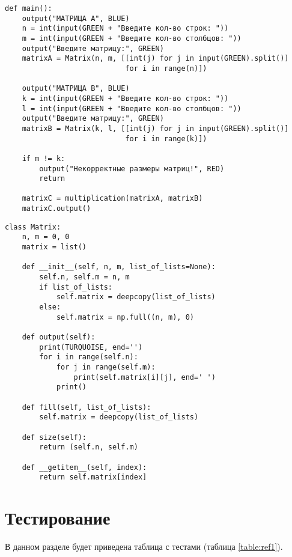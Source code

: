 \begin{lstlisting}[label=some-code,caption=Главная функция main]
def main():
    output("МАТРИЦА A", BLUE)
    n = int(input(GREEN + "Введите кол-во строк: "))
    m = int(input(GREEN + "Введите кол-во столбцов: "))
    output("Введите матрицу:", GREEN)
    matrixA = Matrix(n, m, [[int(j) for j in input(GREEN).split()]
                            for i in range(n)])

    output("МАТРИЦА B", BLUE)
    k = int(input(GREEN + "Введите кол-во строк: "))
    l = int(input(GREEN + "Введите кол-во столбцов: "))
    output("Введите матрицу:", GREEN)
    matrixB = Matrix(k, l, [[int(j) for j in input(GREEN).split()]
                            for i in range(k)])

    if m != k:
        output("Некорректные размеры матриц!", RED)
        return

    matrixC = multiplication(matrixA, matrixB)
    matrixC.output()
\end{lstlisting}

\begin{lstlisting}[label=some-code,caption=Класс matrix]
class Matrix:
    n, m = 0, 0
    matrix = list()

    def __init__(self, n, m, list_of_lists=None):
        self.n, self.m = n, m
        if list_of_lists:
            self.matrix = deepcopy(list_of_lists)
        else:
            self.matrix = np.full((n, m), 0)

    def output(self):
        print(TURQUOISE, end='')
        for i in range(self.n):
            for j in range(self.m):
                print(self.matrix[i][j], end=' ')
            print()

    def fill(self, list_of_lists):
        self.matrix = deepcopy(list_of_lists)

    def size(self):
        return (self.n, self.m)

    def __getitem__(self, index):
        return self.matrix[index]
\end{lstlisting}

\section{Тестирование}

В данном разделе будет приведена таблица с тестами (таблица \ref{table:ref1}).

